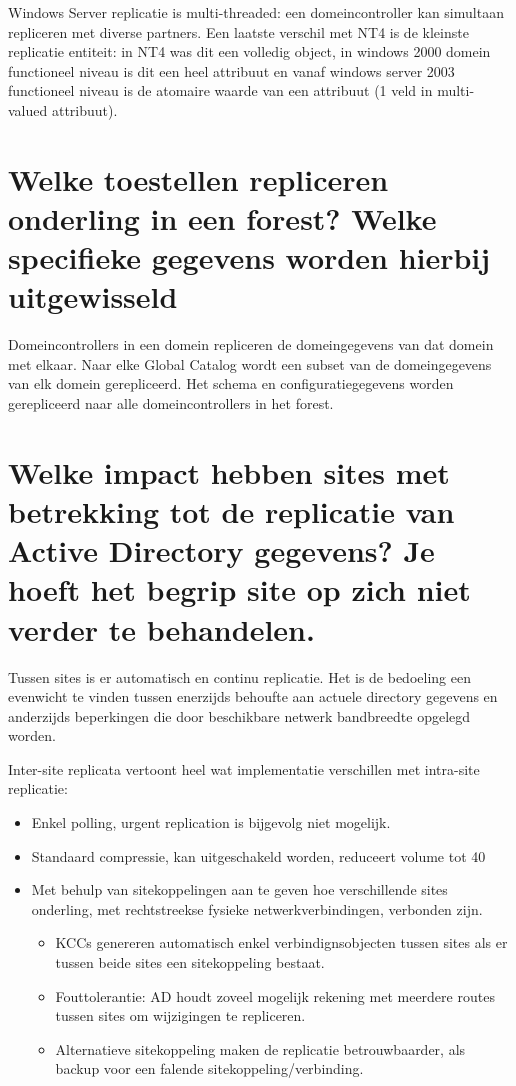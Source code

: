 Windows Server replicatie is multi-threaded: een domeincontroller kan simultaan
repliceren met diverse partners. Een laatste verschil met NT4 is de kleinste
replicatie entiteit: in NT4 was dit een volledig object, in windows 2000
domein functioneel niveau is dit een heel attribuut en vanaf windows server 2003
functioneel niveau is de atomaire waarde van een attribuut (1 veld in
multi-valued attribuut).

\section{Welke toestellen repliceren onderling in een forest? Welke
specifieke gegevens worden hierbij uitgewisseld}

Domeincontrollers in een domein repliceren de domeingegevens van dat domein met
elkaar. Naar elke Global Catalog wordt een subset van de domeingegevens van elk
domein gerepliceerd. Het schema en configuratiegegevens worden gerepliceerd naar
alle domeincontrollers in het forest.

\section{Welke impact hebben sites met betrekking tot de replicatie van Active
Directory gegevens? Je hoeft het begrip site op zich niet verder te behandelen.}

Tussen sites is er automatisch en continu replicatie. Het is de bedoeling een
evenwicht te vinden tussen enerzijds behoufte aan actuele directory gegevens en
anderzijds beperkingen die door beschikbare netwerk bandbreedte opgelegd worden.

Inter-site replicata vertoont heel wat implementatie verschillen met intra-site
replicatie:
\begin{itemize}
	\item Enkel polling, urgent replication is bijgevolg niet mogelijk.
	\item Standaard compressie, kan uitgeschakeld worden, reduceert volume
		tot 40%
	\item Met behulp van sitekoppelingen aan te geven hoe verschillende
		sites onderling, met rechtstreekse fysieke netwerkverbindingen,
		verbonden zijn.
		\begin{itemize}
			\item KCCs genereren automatisch enkel
				verbindignsobjecten tussen sites als er tussen
				beide sites een sitekoppeling bestaat.
			\item Fouttolerantie: AD houdt zoveel mogelijk rekening
				met meerdere routes tussen sites om wijzigingen
				te repliceren.
			\item Alternatieve sitekoppeling maken de replicatie
				betrouwbaarder, als backup voor een falende
				sitekoppeling/verbinding.
		\end{itemize}
\end{itemize}
